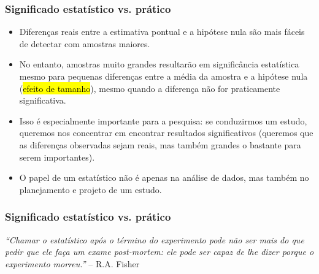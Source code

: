 \begin{frame}
\frametitle{Significado estatístico vs. prático}

\begin{itemize}
\justifying
\item Diferenças reais entre a estimativa pontual e a hipótese nula são mais fáceis de detectar com amostras maiores.
\justifying
\item No entanto, amostras muito grandes resultarão em significância estatística mesmo para pequenas diferenças entre a média da amostra e a hipótese nula (\hl{efeito de tamanho}), mesmo quando a diferença não for praticamente significativa.
\justifying
\item Isso é especialmente importante para a pesquisa: se conduzirmos um estudo, queremos nos concentrar em encontrar resultados significativos (queremos que as diferenças observadas sejam reais, mas também grandes o bastante para serem importantes).
\justifying
\item O papel de um estatístico não é apenas na análise de dados, mas também no planejamento e projeto de um estudo.
\end{itemize}

\end{frame}
\begin{frame}
\frametitle{Significado estatístico vs. prático}

\justifying
\begin{center}{\footnotesize
\textit{``Chamar o estatístico após o término do experimento pode não ser mais do que pedir que ele faça um exame post-mortem: ele pode ser capaz de lhe dizer porque o experimento morreu.''} -- R.A. Fisher
}\end{center}

\end{frame}



